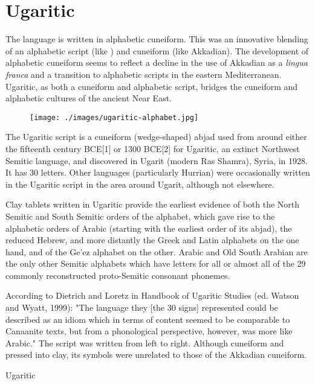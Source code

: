 \section{Ugaritic}
\label{s:ugaritic}

\newfontfamily{}

The  language  is written in alphabetic cuneiform. This was an innovative blending of an alphabetic script (like ) and cuneiform (like Akkadian). The development of alphabetic cuneiform seems to reflect a decline in the use of Akkadian as a \textit{lingua franca} and a transition to alphabetic scripts in the eastern Mediterranean. Ugaritic, as both a cuneiform and alphabetic script, bridges the cuneiform and alphabetic cultures of the ancient Near East.


\begin{figure}[hb]
\centering
\texttt{[image: ./images/ugaritic-alphabet.jpg]}
\end{figure}

The Ugaritic script is a cuneiform (wedge-shaped) abjad used from around either the fifteenth century BCE[1] or 1300 BCE[2] for Ugaritic, an extinct Northwest Semitic language, and discovered in Ugarit (modern Ras Shamra), Syria, in 1928. It has 30 letters. Other languages (particularly Hurrian) were occasionally written in the Ugaritic script in the area around Ugarit, although not elsewhere.

Clay tablets written in Ugaritic provide the earliest evidence of both the North Semitic and South Semitic orders of the alphabet, which gave rise to the alphabetic orders of Arabic (starting with the earliest order of its abjad), the reduced Hebrew, and more distantly the Greek and Latin alphabets on the one hand, and of the Ge'ez alphabet on the other. Arabic and Old South Arabian are the only other Semitic alphabets which have letters for all or almost all of the 29 commonly reconstructed proto-Semitic consonant phonemes. 

According to Dietrich and Loretz in Handbook of Ugaritic Studies (ed. Watson and Wyatt, 1999): "The language they [the 30 signs] represented could be described as an idiom which in terms of content seemed to be comparable to Canaanite texts, but from a phonological perspective, however, was more like Arabic."
The script was written from left to right. Although cuneiform and pressed into clay, its symbols were unrelated to those of the Akkadian cuneiform.

\begin{scriptexample}[]{Ugaritic}
\end{scriptexample}


